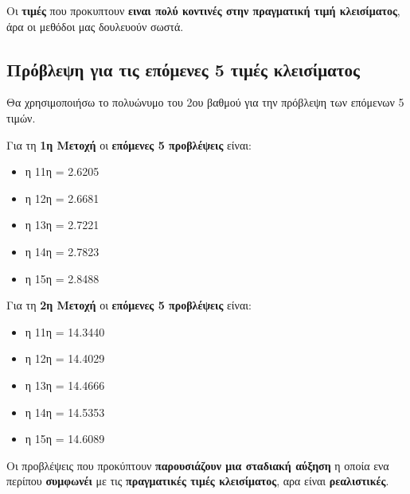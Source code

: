 \documentclass[18pt]{article}
\begin{document}
\vspace{0.5cm}

Οι \textbf{τιμές} που προκυπτουν \textbf{ειναι πολύ κοντινές στην πραγματική τιμή κλεισίματος}, άρα οι μεθόδοι μας δουλευούν σωστά.

\newpage
\subsection*{Πρόβλεψη για τις επόμενες 5 τιμές κλεισίματος}

Θα χρησιμοποιήσω το πολυώνυμο του 2ου βαθμού για την πρόβλεψη των επόμενων 5 τιμών.

\vspace{0.5cm}

Για τη \textbf{1η Μετοχή} οι \textbf{επόμενες 5 προβλέψεις} είναι:

\begin{itemize}
    \item η 11η =  2.6205
    \item η 12η =  2.6681
    \item η 13η =  2.7221
    \item η 14η =  2.7823
    \item η 15η =  2.8488
\end{itemize}

\vspace{0.5cm}


Για τη \textbf{2η Μετοχή} οι \textbf{επόμενες 5 προβλέψεις} είναι:

\begin{itemize}
    \item η 11η =  14.3440
    \item η 12η =  14.4029
    \item η 13η =  14.4666
    \item η 14η =  14.5353
    \item η 15η =  14.6089
\end{itemize}

Οι προβλέψεις που προκύπτουν \textbf{παρουσιάζουν μια σταδιακή αύξηση} η οποία ενα περίπου \textbf{συμφωνέι} με τις \textbf{πραγματικές τιμές κλεισίματος}, αρα είναι \textbf{ρεαλιστικές}.
\end{document}
